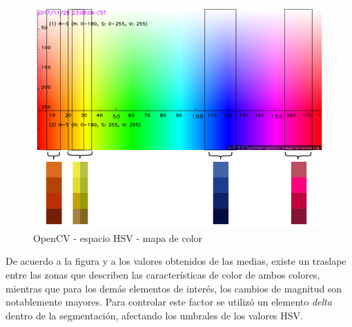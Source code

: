 \begin{figure}[ht]
    \centering
    \includegraphics[scale=0.4]{Figures/PieceColors_HSVColorMap.png}
        \caption{OpenCV - espacio HSV - mapa de color \cite{pai_adityapai2398colour-segmentation--opencv_2022}}
        \label{fig:ColorMapHSVOpenCV}
\end{figure}

De acuerdo a la figura y a los valores obtenidos de las medias, existe un traslape entre las zonas que describen las características de color de ambos colores, mientras que para los demás elementos de interés, los cambios de magnitud son notablemente mayores. Para controlar este factor se utilizó un elemento \textit{delta} dentro de la segmentación, afectando los umbrales de los valores HSV.


